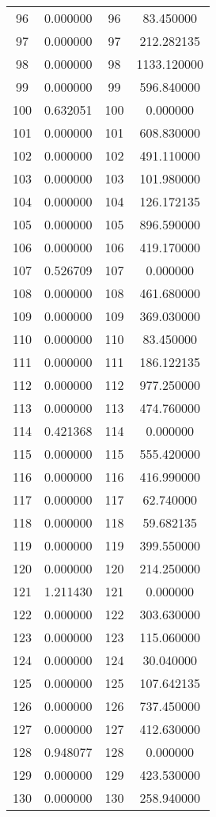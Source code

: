 \documentclass[12pt]{article}
\begin{document}
\begin{longtable}{@{}cccc@{}}
96 & 0.000000 & 96 & 83.450000 \\
97 & 0.000000 & 97 & 212.282135 \\
98 & 0.000000 & 98 & 1133.120000 \\
99 & 0.000000 & 99 & 596.840000 \\
100 & 0.632051 & 100 & 0.000000 \\
101 & 0.000000 & 101 & 608.830000 \\
102 & 0.000000 & 102 & 491.110000 \\
103 & 0.000000 & 103 & 101.980000 \\
104 & 0.000000 & 104 & 126.172135 \\
105 & 0.000000 & 105 & 896.590000 \\
106 & 0.000000 & 106 & 419.170000 \\
107 & 0.526709 & 107 & 0.000000 \\
108 & 0.000000 & 108 & 461.680000 \\
109 & 0.000000 & 109 & 369.030000 \\
110 & 0.000000 & 110 & 83.450000 \\
111 & 0.000000 & 111 & 186.122135 \\
112 & 0.000000 & 112 & 977.250000 \\
113 & 0.000000 & 113 & 474.760000 \\
114 & 0.421368 & 114 & 0.000000 \\
115 & 0.000000 & 115 & 555.420000 \\
116 & 0.000000 & 116 & 416.990000 \\
117 & 0.000000 & 117 & 62.740000 \\
118 & 0.000000 & 118 & 59.682135 \\
119 & 0.000000 & 119 & 399.550000 \\
120 & 0.000000 & 120 & 214.250000 \\
121 & 1.211430 & 121 & 0.000000 \\
122 & 0.000000 & 122 & 303.630000 \\
123 & 0.000000 & 123 & 115.060000 \\
124 & 0.000000 & 124 & 30.040000 \\
125 & 0.000000 & 125 & 107.642135 \\
126 & 0.000000 & 126 & 737.450000 \\
127 & 0.000000 & 127 & 412.630000 \\
128 & 0.948077 & 128 & 0.000000 \\
129 & 0.000000 & 129 & 423.530000 \\
130 & 0.000000 & 130 & 258.940000 \\

\end{longtable}
\end{document}

